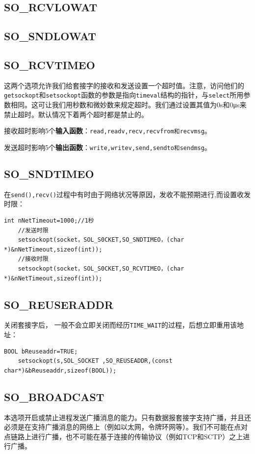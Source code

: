 \documentclass[UTF8,a4paper,8pt]{ctexbook}
\begin{document}
		\subsection{SO\_RCVLOWAT}
		\subsection{SO\_SNDLOWAT}
		\subsection{SO\_RCVTIMEO}
			这两个选项允许我们给套接字的接收和发送设置一个超时值。注意，访问他们的\verb|getsockopt|和\verb|setsockopt|函数的参数是指向\verb|timeval|结构的指针，与\verb|select|所用参数相同。这可让我们用秒数和微妙数来规定超时。我们通过设置其值为0s和0μs来禁止超时。默认情况下着两个超时都是禁止的。
			
			接收超时影响5个\textbf{输入函数}：\verb|read,readv,recv,recvfrom和recvmsg|。
			
			发送超时影响5个\textbf{输出函数}：\verb|write,writev,send,sendto和sendmsg|。
			
		\subsection{SO\_SNDTIMEO}
			在\verb|send(),recv()|过程中有时由于网络状况等原因，发收不能预期进行,而设置收发时限：
			\begin{lstlisting}[frame=L]
	int nNetTimeout=1000;//1秒
	//发送时限
	setsockopt(socket，SOL_S0CKET,SO_SNDTIMEO，(char *)&nNetTimeout,sizeof(int));
	//接收时限
	setsockopt(socket，SOL_S0CKET,SO_RCVTIMEO，(char *)&nNetTimeout,sizeof(int));
			\end{lstlisting}
			
		\subsection{SO\_REUSERADDR}
			关闭套接字后， 一般不会立即关闭而经历\verb|TIME_WAIT|的过程，后想立即重用该地址：
			\begin{lstlisting}[frame=L]
	BOOL bReuseaddr=TRUE;
	setsockopt(s,SOL_SOCKET ,SO_REUSEADDR,(const char*)&bReuseaddr,sizeof(BOOL));
			\end{lstlisting}
			
		\subsection{SO\_BROADCAST}
			本选项开启或禁止进程发送广播消息的能力。只有数据报套接字支持广播，并且还必须是在支持广播消息的网络上（例如以太网，令牌环网等）。我们不可能在点对点链路上进行广播，也不可能在基于连接的传输协议（例如TCP和SCTP）之上进行广播。
			
\end{document}
